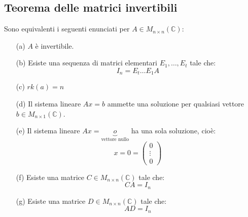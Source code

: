 \documentclass[a4paper]{article}
\theoremstyle{break}
\theoremstyle{break}
\theoremstyle{break}
\theoremstyle{break}
\begin{document}
\subsection{Teorema delle matrici invertibili}
\label{4.3}
Sono equivalenti i seguenti enunciati per \( A \in M_{n \times n}(\mathbb{C}) \):
\begin{enumerate}
  \item[(a)] \( A \) è invertibile.
  \item[(b)] Esiste una sequenza di matrici elementari \( E_1, \ldots, E_t \) tale che:
    \[
      I_n = E_t \ldots E_1 A
    \]
  \item[(c)] \( rk(a) = n \)
  \item[(d)] Il sistema lineare \( Ax = b \) ammette una soluzione per qualsiasi vettore \( b \in 
    M_{n \times 1}(\mathbb{C}) \).
  \item[(e)] Il sistema lineare \( Ax = \underbrace{o}_{\text{vettore nullo}} \) ha una
    sola soluzione, cioè: \[ x = 0 = \begin{pmatrix} 0 \\ \vdots \\ 0 \end{pmatrix}  \]
  \item[(f)] Esiste una matrice \( C \in M_{n \times n}(\mathbb{C}) \) tale che:
    \[
      CA = I_n
    \]
  \item[(g)] Esiste una matrice \( D \in M_{n \times n}(\mathbb{C}) \) tale che:
    \[
      AD = I_n
    \]
\end{enumerate}
\end{document}
